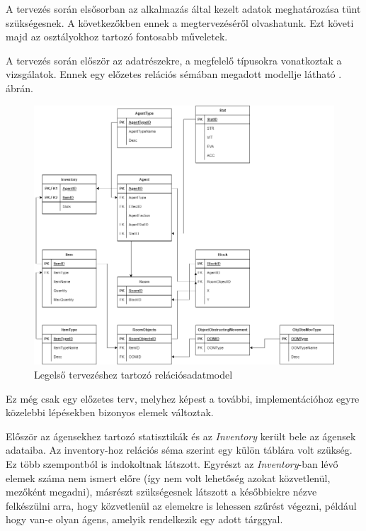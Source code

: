 
A tervezés során elsősorban az alkalmazás által kezelt adatok meghatározása tünt szükségesnek. A következőkben ennek a megtervezéséről olvashatunk. Ezt követi majd az osztályokhoz tartozó fontosabb műveletek.


A tervezés során először az adatrészekre, a megfelelő típusokra vonatkoztak a vizsgálatok. Ennek egy előzetes relációs sémában megadott modellje látható . ábrán.

\begin{figure}[!ht]
    \centering
    \includegraphics[width=\textwidth]{images/relaciosadatmodel7.png}
    \caption{Legelső tervezéshez tartozó relációsadatmodel}
    \label{fig:relmod}
\end{figure}

Ez még csak egy előzetes terv, melyhez képest a további, implementációhoz egyre közelebbi lépésekben bizonyos elemek változtak.

Először az ágensekhez tartozó statisztikák és az \textit{Inventory} került bele az ágensek adataiba. Az inventory-hoz relációs séma szerint egy külön táblára volt szükség. Ez több szempontból is indokoltnak látszott. Egyrészt az \textit{Inventory}-ban lévő elemek száma nem ismert előre (így nem volt lehetőség azokat közvetlenül, mezőként megadni), másrészt szükségesnek látszott a későbbiekre nézve felkészülni arra, hogy közvetlenül az elemekre is lehessen szűrést végezni, például hogy van-e olyan ágens, amelyik rendelkezik egy adott tárggyal.

